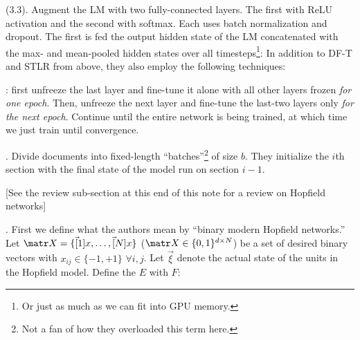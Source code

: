 \documentclass[11pt]{article}
\begin{document}
\myspace
\p {} (3.3). Augment the LM with two fully-connected layers. The first with ReLU activation and the second with softmax. Each uses batch normalization and dropout. The first is fed the output hidden state of the LM concatenated with the max- and mean-pooled hidden states over all timesteps\footnote{Or just as much as we can fit into GPU memory.}:
In addition to DF-T and STLR from above, they also employ the following techniques:
\begin{compactitem}
	\item  {}: first unfreeze the last layer and fine-tune it alone with all other layers frozen \textit{for one epoch}. Then, unfreeze the next layer and fine-tune the last-two layers only \textit{for the next epoch}. Continue until the entire network is being trained, at which time we just train until convergence.
	\item {}. Divide documents into fixed-length ``batches''\footnote{Not a fan of how they overloaded this term here.} of size $b$. They initialize the $i$th section with the final state of the model run on section $i -1$. 
\end{compactitem}








[See the review sub-section at this end of this note for a review on Hopfield networks]

. First we define what the authors mean by ``binary modern Hopfield networks.'' Let $\matr X = \{ \vec[1]{x}, \ldots, \vec[N]{x} \}$ ($\matr X \in \{0, 1\}^{d \times N}$) be a set of desired binary vectors with $x_{ij} \in \{-1, +1\}$ $\forall i, j$. Let $\vec\xi$ denote the actual state of the units in the Hopfield model. Define the  $E$ with  $F$:
\end{document}

